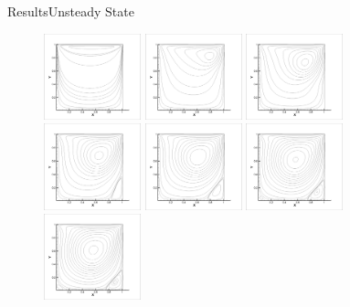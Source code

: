 \documentclass[11pt]{beamer}
\begin{document}
\begin{frame}{Results}{Unsteady State}
\begin{figure}[hH]
\includegraphics[width=0.25\textwidth]{images/unsteady/re40010}
\includegraphics[width=0.25\textwidth]{images/unsteady/re40011}
\includegraphics[width=0.25\textwidth]{images/unsteady/re40012}
\includegraphics[width=0.25\textwidth]{images/unsteady/re40013}\linebreak
\includegraphics[width=0.25\textwidth]{images/unsteady/re4001}
\includegraphics[width=0.25\textwidth]{images/unsteady/re4002}
\includegraphics[width=0.25\textwidth]{images/unsteady/re4003}

\end{figure}
\end{frame}
\end{document}
